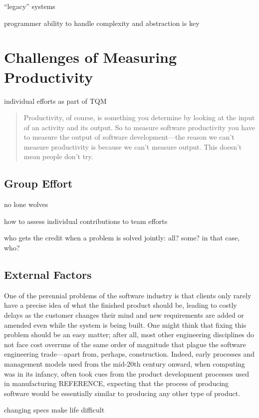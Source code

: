 \documentclass[letterpaper, 12pt]{report}
\begin{document}
``legacy'' systems

programmer ability to handle complexity and abstraction is key

\section{Challenges of Measuring Productivity}
individual efforts as part of TQM

\cite{fowler:cannotmeasure}
\begin{quote}
Productivity, of course, is something you determine by looking at the input of an activity and its output. 
So to measure software productivity you have to measure the output of software development---the reason we can't measure productivity is because we can't measure output. 
This doesn't mean people don't try. 
\end{quote}


\subsection{Group Effort}
no lone wolves

how to assess individual contributions to team efforts

who gets the credit when a problem is solved jointly: all? some? in that case, who?

\subsection{External Factors}
One of the perennial problems of the software industry is that clients only rarely have a precise idea of what the finished product should be, leading to costly delays as the customer changes their mind and new requirements are added or amended even while the system is being built.
One might think that fixing this problem should be an easy matter; after all, most other engineering disciplines do not face cost overruns of the same order of magnitude that plague the software engineering trade---apart from, perhaps, construction. 
Indeed, early processes and management models used from the mid-20th century onward, when computing was in its infancy, often took cues from the product development processes used in manufacturing REFERENCE, expecting that the process of producing software would be essentially similar to producing any other type of product.

changing specs make life difficult
\end{document}
